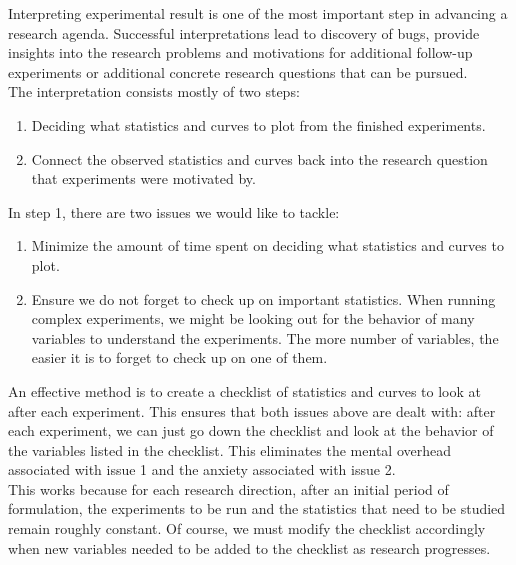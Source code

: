 \documentclass[11pt]{article}
\begin{document}
Interpreting experimental result is one of the most important step in advancing a research agenda. Successful interpretations lead to discovery of bugs, provide insights into the research problems and motivations for additional follow-up experiments or additional concrete research questions that can be pursued. 
\\

The interpretation consists mostly of two steps:

\begin{enumerate}
	\item Deciding what statistics and curves to plot from the finished experiments.
	\item Connect the observed statistics and curves back into the research question that experiments were motivated by.
\end{enumerate}

In step 1, there are two issues we would like to tackle:

\begin{enumerate}
	\item Minimize the amount of time spent on deciding what statistics and curves to plot.
	\item Ensure we do not forget to check up on important statistics. When running complex experiments, we might be looking out for the behavior of many variables to understand the experiments. The more number of variables, the easier it is to forget to check up on one of them.
\end{enumerate}

An effective method is to create a checklist of statistics and curves to look at after each experiment. This ensures that both issues above are dealt with: after each experiment, we can just go down the checklist and look at the behavior of the variables listed in the checklist. This eliminates the mental overhead associated with issue 1 and the anxiety associated with issue 2.
\\

This works because for each research direction, after an initial period of formulation, the experiments to be run and the statistics that need to be studied remain roughly constant. Of course, we must modify the checklist accordingly when new variables needed to be added to the checklist as research progresses.
\end{document}
